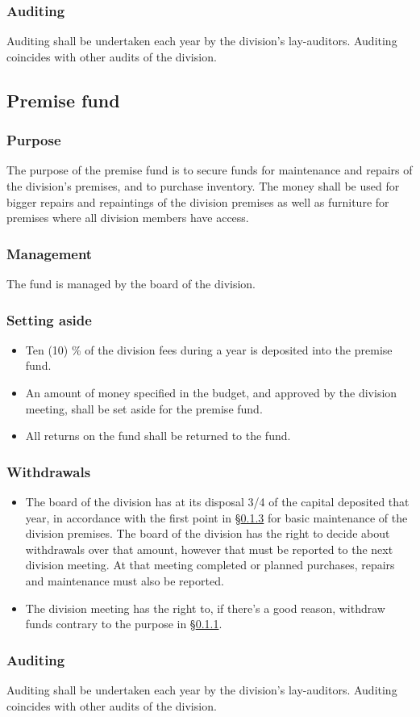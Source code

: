 \documentclass[a4paper]{dtek}
\begin{document}
\subsubsection{Auditing}
Auditing shall be undertaken each year by the division's lay-auditors. Auditing coincides with other audits of the division.

\subsection{Premise fund}
\subsubsection{Purpose}
\label{sec:lokalfond_syfte}
The purpose of the premise fund is to secure funds for maintenance and repairs of the division's premises, and to purchase inventory. The money shall be used for bigger repairs and repaintings of the division premises as well as furniture for premises where all division members have access.
\subsubsection{Management}
The fund is managed by the board of the division.
\subsubsection{Setting aside}
\label{sec:lokalfond_avsattning}
\begin{itemize}
    \item Ten (10) \% of the division fees during a year is deposited into the premise fund.
    \item An amount of money specified in the budget, and approved by the division meeting, shall be set aside for the premise fund.
    \item All returns on the fund shall be returned to the fund.
\end{itemize}
\subsubsection{Withdrawals}
\begin{itemize}
    \item The board of the division has at its disposal 3/4 of the capital deposited that year, in accordance with the first point in §\ref{sec:lokalfond_avsattning} for basic maintenance of the division premises. The board of the division has the right to decide about withdrawals over that amount, however that must be reported to the next division meeting. At that meeting completed or planned purchases, repairs and maintenance must also be reported.
    \item The division meeting has the right to, if there's a good reason, withdraw funds contrary to the purpose in §\ref{sec:lokalfond_syfte}.
\end{itemize}
\subsubsection{Auditing}
Auditing shall be undertaken each year by the division's lay-auditors. Auditing coincides with other audits of the division.
\end{document}
